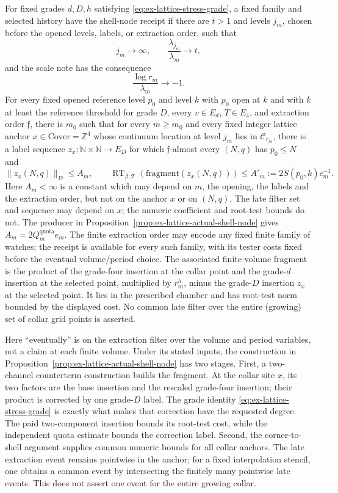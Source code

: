 \begin{definition}
\label{def:ex-lattice-shell-receipt}
For fixed grades $d,D,h$ satisfying \eqref{eq:ex-lattice-stress-grade}, a
fixed family and selected history have the shell-node receipt if there are
$t>1$ and levels $j_m$, chosen before the opened levels, labels, or extraction
order, such that
\[
 j_m\longrightarrow\infty,\qquad
 \frac{\lambda_{j_m}}{\lambda_m}\longrightarrow t,
\]
and the scale note has the consequence
\[
                         \frac{\log r_m}{\lambda_m}\longrightarrow-1.
\]
For every fixed opened reference level $p_0$ and level $k$ with $p_0$ open at $k$ and
with $k$ at least the reference threshold for grade $D$, every $v\in E_d$,
$T\in E_4$, and extraction order $\mathfrak f$, there is $m_0$ such
that for every $m\geq m_0$ and every fixed integer lattice anchor
$x\in\mathrm{Cover}=\mathbb Z^4$ whose continuum location at level $j_m$
lies in $\mathcal C_{r_m}$, there is a label sequence
$z_x: \mathbb N\times\mathbb N\to E_D$ for which
$\mathfrak f$-almost every $(N,q)$ has $p_0\leq N$ and
\[
  \|z_x(N,q)\|_D\leq A_m,\qquad
  \operatorname{RT}_{\beta,\mathcal T}(\text{fragment}(z_x(N,q)))
       \leq A'_m:=2S(p_0,k)c_m^{-1}.
\]
Here $A_m<\infty$ is a constant which may depend on $m$, the opening, the
labels and the extraction order, but not on the anchor $x$ or on $(N,q)$.
The late filter set and sequence may depend on $x$; the numeric coefficient
and root-test bounds do not.  The producer in
Proposition~\ref{prop:ex-lattice-actual-shell-node} gives
$A_m=2Q_m^{\mathrm{quota}}e_m$.  The finite extraction order may encode any fixed finite family of
watches; the receipt is available for every such family, with its tester costs
fixed before the eventual volume/period choice.
The associated finite-volume fragment is the product of the grade-four
insertion at the collar point and the grade-$d$ insertion at the selected
point, multiplied by $r_m^h$, minus the grade-$D$ insertion $z_x$ at the
selected point.  It lies in the prescribed chamber and has root-test norm
bounded by the displayed cost.  No common late filter over the entire (growing)
set of collar grid points is asserted.
\end{definition}

Here ``eventually'' is on the extraction filter over the volume and period
variables, not a claim at each finite volume. Under its stated inputs, the
construction in Proposition~\ref{prop:ex-lattice-actual-shell-node} has two
stages.  First, a two-channel counterterm construction builds the fragment.
At the collar site $x$, its two factors are the
base insertion and the rescaled grade-four insertion; their product is
corrected by one grade-$D$ label.  The grade identity \eqref{eq:ex-lattice-stress-grade}
is exactly what makes that correction have the requested degree.  The paid
two-component insertion bounds its root-test cost, while the independent
quota estimate bounds the correction label.  Second, the corner-to-shell
argument supplies common numeric bounds for all collar anchors.  The late
extraction event remains pointwise in the anchor; for a fixed interpolation
stencil, one obtains a common event by intersecting the finitely many
pointwise late events.  This does not assert one event for the entire growing
collar.

